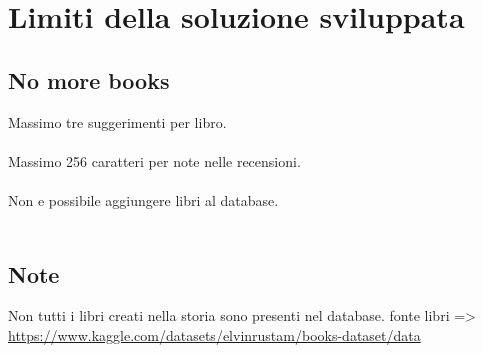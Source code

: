 \documentclass{report}
\begin{document}
\chapter{Limiti della soluzione sviluppata}
\section{No more books}
Massimo tre suggerimenti per libro. \\ \\
Massimo 256 caratteri per note nelle recensioni. \\ \\
Non e possibile aggiungere libri al database. \\ \\ %
\section{Note}
Non tutti i libri creati nella storia sono presenti nel database. 
fonte libri => \url{https://www.kaggle.com/datasets/elvinrustam/books-dataset/data}
\end{document}
